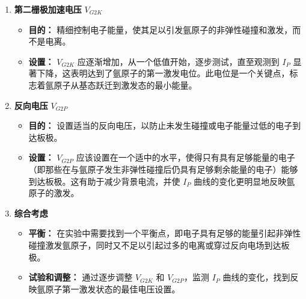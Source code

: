 \documentclass[dvipsnames, svgnames,a4paper,11pt]{article}
\begin{document}
\begin{enumerate}
\begin{enumerate}
			\item \textbf{第二栅极加速电压} \( V_{G2K} \)
			\begin{itemize}
				\item \textbf{目的：} 精细控制电子能量，使其足以引发氩原子的非弹性碰撞和激发，而不是电离。
				\item \textbf{设置：} \( V_{G2K} \) 应逐渐增加，从一个低值开始，逐步测试，直至观测到 \( I_P \) 显著下降，这表明达到了氩原子的第一激发电位。此电位是一个关键点，标志着氩原子从基态跃迁到激发态的最小能量。
			\end{itemize}
			
			\item \textbf{反向电压} \( V_{G2P} \)
			\begin{itemize}
				\item \textbf{目的：} 设置适当的反向电压，以防止未发生碰撞或电子能量过低的电子到达板极。
				\item \textbf{设置：} \( V_{G2P} \) 应该设置在一个适中的水平，使得只有具有足够能量的电子（即那些在与氩原子发生非弹性碰撞后仍具有足够剩余能量的电子）能够到达板极。这有助于减少背景电流，并使 \( I_P \) 曲线的变化更明显地反映氩原子的激发。
			\end{itemize}
			
			\item \textbf{综合考虑}
			\begin{itemize}
				\item \textbf{平衡：} 在实验中需要找到一个平衡点，即电子具有足够的能量引起非弹性碰撞激发氩原子，同时又不足以引起过多的电离或穿过反向电场到达板极。
				\item \textbf{试验和调整：} 通过逐步调整 \( V_{G2K} \) 和 \( V_{G2P} \)，监测 \( I_P \) 曲线的变化，找到反映氩原子第一激发状态的最佳电压设置。
			\end{itemize}
		\end{enumerate}		
		
	\end{enumerate}
	
\end{document}
